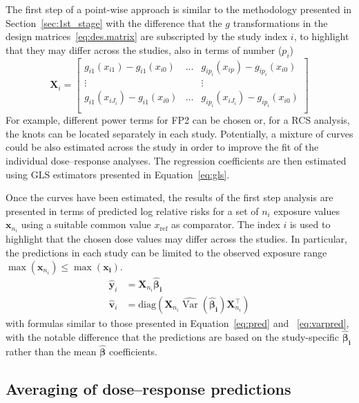 \documentclass[11pt,a4paper,twoside,openany]{book}\usepackage{knitr}
\DeclareMathOperator{\Var}{Var}
\begin{document}
{{The first step of a point-wise approach is similar to the methodology presented in Section~\ref{sec:1st_stage} with the difference that the $g$ transformations in the design matrices~\ref{eq:des.matrix} are subscripted by the study index $i$, to highlight that they may differ across the studies, also in terms of number ($p_i$) 
\begin{equation}
 \mathbf{X}_i=\left[
\begin{array}{ccc}
g_{i1}(x_{i1}) - g_{i1}(x_{i0}) & \hdots & g_{ip_i}(x_{ip}) - g_{ip_i}(x_{i0}) \\
\vdots &  & \vdots \\
g_{i1}(x_{iJ_i}) -  g_{i1}(x_{i0}) & \hdots & g_{ip_i}(x_{iJ_i}) -  g_{ip_i}(x_{i0}) \\
\end{array}
\right] 
\label{eq:des.matrix_pwa}
\end{equation}
\noindent For example, different power terms for FP2 can be chosen or, for a RCS analysis, the knots can be located separately in each study. Potentially, a mixture of curves could be also estimated across the study in order to improve the fit of the individual dose--response analyses. The regression coefficients are then estimated using GLS estimators presented in Equation~\ref{eq:gls}.

Once the curves have been estimated, the results of the first step analysis are presented in terms of predicted log relative risks for a set of $n_i$ exposure values $\mathbf{x}_{n_i}$ using a suitable common value $x_\mathrm{ref}$ as comparator. The index $i$ is used to highlight that the chosen dose values may differ across the studies. In particular, the predictions in each study can be limited to the observed exposure range $\max \left( \mathbf{x}_{n_i} \right) \le \max \left( \mathbf{x_i} \right)$.
\begin{align}
\hat {\boldsymbol y}_i &= \mathbf{X}_{n_i} \boldsymbol{\hat \beta_i}
\label{eq:pred_pwa} \\
\hat{\boldsymbol{v}}_i &= \mathrm{diag}\left( \mathbf{X}_{n_i} \widehat{\Var} \left( \boldsymbol{\hat \beta_i} \right) \mathbf{X}_{n_i}^\top \right)
\label{eq:predv_pwa}
\end{align}
\noindent with formulas similar to those presented in Equation~\ref{eq:pred} and ~\ref{eq:varpred}, with the notable difference that the predictions are based on the study-specific $\boldsymbol{\hat \beta_i}$ rather than the mean $\boldsymbol{\hat \beta}$ coefficients.

\subsection{Averaging of dose--response predictions}

}}
\end{document}
